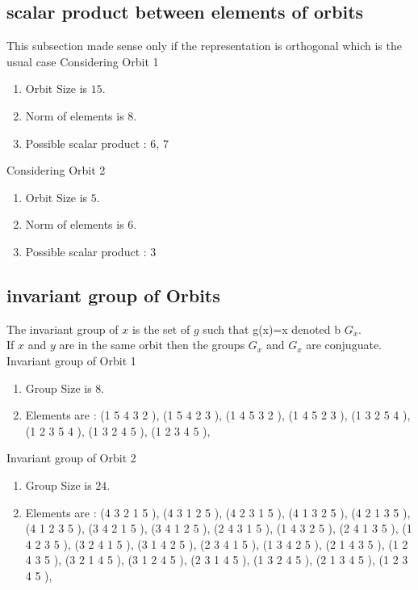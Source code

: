 \documentclass[12pt]{article}
\begin{document}
\subsection{scalar product between elements of orbits}
\noindent This subsection made sense only if the representation is orthogonal which is the usual case
Considering Orbit 1
\begin{enumerate}
\item Orbit Size is $15$.
\item Norm of elements is $8$.
\item Possible scalar product : $6$, $7$
\end{enumerate}
Considering Orbit 2
\begin{enumerate}
\item Orbit Size is $5$.
\item Norm of elements is $6$.
\item Possible scalar product : $3$
\end{enumerate}
\subsection{invariant group of Orbits}
\noindent The invariant group of $x$ is the set of $g$ such that g(x)=x denoted b $G_x$.\\
If $x$ and $y$ are in the same orbit then the groups $G_x$ and  $G_x$ are conjuguate.\\
Invariant group of Orbit 1
\begin{enumerate}
\item Group Size is $8$.
\item Elements are : (1 5 4 3 2  ), (1 5 4 2 3  ), (1 4 5 3 2  ), (1 4 5 2 3  ), (1 3 2 5 4  ), (1 2 3 5 4  ), (1 3 2 4 5  ), (1 2 3 4 5  ), 
\end{enumerate}
Invariant group of Orbit 2
\begin{enumerate}
\item Group Size is $24$.
\item Elements are : (4 3 2 1 5  ), (4 3 1 2 5  ), (4 2 3 1 5  ), (4 1 3 2 5  ), (4 2 1 3 5  ), (4 1 2 3 5  ), (3 4 2 1 5  ), (3 4 1 2 5  ), (2 4 3 1 5  ), (1 4 3 2 5  ), (2 4 1 3 5  ), (1 4 2 3 5  ), (3 2 4 1 5  ), (3 1 4 2 5  ), (2 3 4 1 5  ), (1 3 4 2 5  ), (2 1 4 3 5  ), (1 2 4 3 5  ), (3 2 1 4 5  ), (3 1 2 4 5  ), (2 3 1 4 5  ), (1 3 2 4 5  ), (2 1 3 4 5  ), (1 2 3 4 5  ), 
\end{enumerate}
\end{document}
